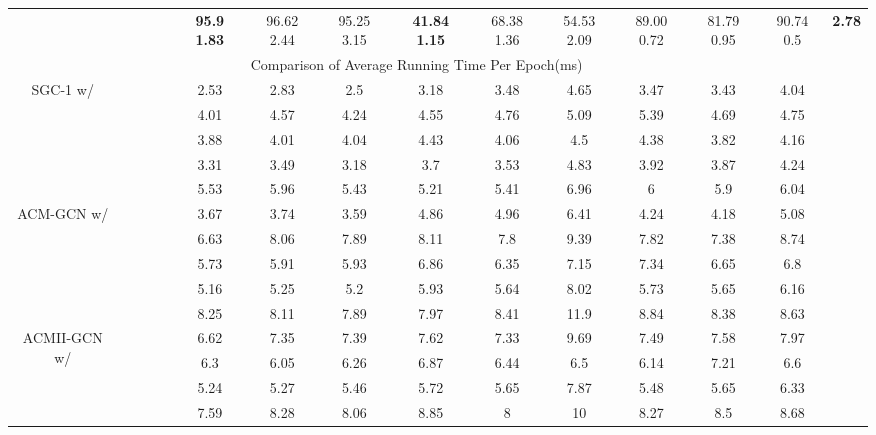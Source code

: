 \documentclass{article}
\newcommand{\0}{{\boldsymbol{0}}}
\newcommand{\6}{{\partial}}
\newcommand{\8}{{\infty}}
\newcommand{\4}{{\nabla}}
\begin{document}
\begin{table}[htbp]
\begin{tabular}{c|cccc|ccccccccc|r}
          &  &  &  &  & \cellcolor[rgb]{ .816,  .808,  .808}\textbf{95.9  1.83} & 96.62  2.44 & 95.25  3.15 & \cellcolor[rgb]{ .816,  .808,  .808}\textbf{41.84  1.15} & 68.38  1.36 & 54.53  2.09 & 89.00  0.72 & 81.79  0.95 & 90.74  0.5 & \multicolumn{1}{c}{\cellcolor[rgb]{ .816,  .808,  .808}\textbf{2.78}} \\
\cmidrule{1-14}    \multicolumn{14}{c|}{Comparison of Average Running Time Per Epoch(ms)}                                        &  \\
\cmidrule{1-14}    \multicolumn{1}{c|}{\multirow{5}[2]{*}{SGC-1 w/}} &  &       &       &       & 2.53  & 2.83  & 2.5   & 3.18  & 3.48  & 4.65  & 3.47  & 3.43  & 4.04  &  \\
          &  &  &       &  & 4.01  & 4.57  & 4.24  & 4.55  & 4.76  & 5.09  & 5.39  & 4.69  & 4.75  &  \\
          &  &       &  &  & 3.88  & 4.01  & 4.04  & 4.43  & 4.06  & 4.5   & 4.38  & 3.82  & 4.16  &  \\
          &  &  &  &       & 3.31  & 3.49  & 3.18  & 3.7   & 3.53  & 4.83  & 3.92  & 3.87  & 4.24  &  \\
          &  &  &  &  & 5.53  & 5.96  & 5.43  & 5.21  & 5.41  & 6.96  & 6     & 5.9   & 6.04  &  \\
\cmidrule{1-14}    \multicolumn{1}{c|}{\multirow{5}[2]{*}{ACM-GCN w/}} &  &       &       &       & 3.67  & 3.74  & 3.59  & 4.86  & 4.96  & 6.41  & 4.24  & 4.18  & 5.08  &  \\
          &  &  &       &  & 6.63  & 8.06  & 7.89  & 8.11  & 7.8   & 9.39  & 7.82  & 7.38  & 8.74  &  \\
          &  &       &  &  & 5.73  & 5.91  & 5.93  & 6.86  & 6.35  & 7.15  & 7.34  & 6.65  & 6.8   &  \\
          &  &  &  &       & 5.16  & 5.25  & 5.2   & 5.93  & 5.64  & 8.02  & 5.73  & 5.65  & 6.16  &  \\
          &  &  &  &  & 8.25  & 8.11  & 7.89  & 7.97  & 8.41  & 11.9  & 8.84  & 8.38  & 8.63  &  \\
\cmidrule{1-14}    \multicolumn{1}{c|}{\multirow{4}[2]{*}{ACMII-GCN w/}} &  &  &       &  & 6.62  & 7.35  & 7.39  & 7.62  & 7.33  & 9.69  & 7.49  & 7.58  & 7.97  &  \\
          &  &       &  &  & 6.3   & 6.05  & 6.26  & 6.87  & 6.44  & 6.5   & 6.14  & 7.21  & 6.6   &  \\
          &  &  &  &       & 5.24  & 5.27  & 5.46  & 5.72  & 5.65  & 7.87  & 5.48  & 5.65  & 6.33  &  \\
          &  &  &  &  & 7.59  & 8.28  & 8.06  & 8.85  & 8     & 10    & 8.27  & 8.5   & 8.68  &  \\
    \bottomrule
    \bottomrule
    \end{tabular}\end{table}
\end{document}
